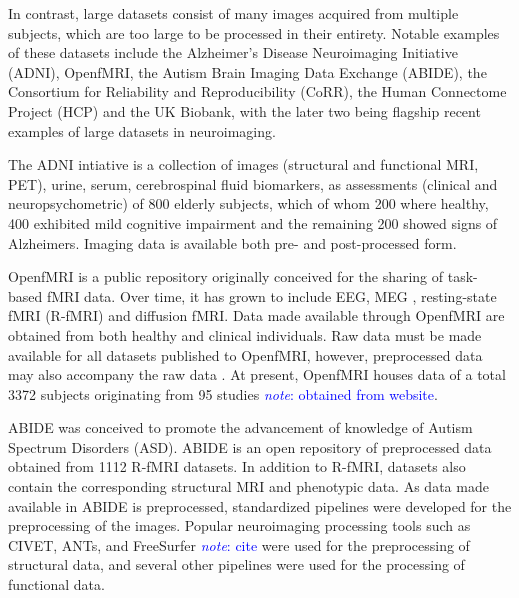 \documentclass{report}
\newcommand{\note}[1]{\textcolor{blue}{\textit{note}: #1}}
\begin{document}
            In contrast, large datasets consist of many images acquired from
            multiple subjects, which are too large to be processed in their
            entirety. Notable examples of these datasets include the 
            Alzheimer's Disease Neuroimaging Initiative (ADNI), OpenfMRI, 
            the Autism Brain Imaging Data Exchange (ABIDE), the Consortium for
            Reliability and Reproducibility (CoRR), the Human Connectome Project
            (HCP) and the UK Biobank, with the later
            two being flagship recent examples of large datasets in neuroimaging.

            The ADNI intiative is a collection of images (structural and 
            functional MRI, PET), urine,
            serum, cerebrospinal fluid biomarkers, as assessments (clinical and
            neuropsychometric) of 800 elderly subjects, which of whom 200 where
            healthy, 400 exhibited mild cognitive impairment and the remaining
            200 showed signs of Alzheimers. Imaging data is available both 
            pre- and post-processed form.

            OpenfMRI is a public repository originally conceived for the sharing
            of task-based fMRI data. Over time, it has grown to include EEG, MEG
            , resting-state fMRI (R-fMRI) and diffusion fMRI. Data made 
            available through
            OpenfMRI are obtained from both healthy and clinical individuals.
            Raw data must be made available for all datasets published to 
            OpenfMRI, however, preprocessed data may also accompany the raw data
            . At present, OpenfMRI houses data of a total 3372 subjects
            originating from 95 studies \note{obtained from website}.

            ABIDE was conceived to promote the advancement of knowledge 
            of Autism Spectrum Disorders (ASD). %
            ABIDE is an open repository of 
            preprocessed data obtained from 1112 R-fMRI datasets.
            In addition to R-fMRI, datasets also contain the corresponding 
            structural MRI and phenotypic data. As data made available in ABIDE
            is preprocessed, standardized pipelines were developed for the 
            preprocessing of the images. Popular neuroimaging processing tools
            such as CIVET, ANTs, and FreeSurfer \note{cite} were used for the 
            preprocessing of structural data, and several other pipelines were
            used for the processing of functional data.
\end{document}
